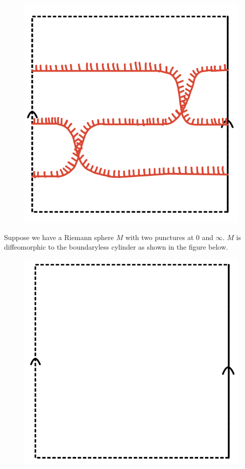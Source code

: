 \begin{figure}[H] 
    \centering
    \includegraphics[scale = 0.95]{diagrams/natural_alternating_diagrams/2.png} 
    \caption{}
    \label{fig:your-label}
\end{figure}

Suppose we have a Riemann sphere $M$ with two punctures at $0$ and $\infty$. $M$ is diffeomorphic to the boundaryless cylinder as shown in the figure below.

\begin{figure}[H]
    \centering
    \includegraphics[scale = 0.95]{diagrams/natural_alternating_diagrams/3.png} 
    \caption{}
    \label{fig:your-label}
\end{figure}

